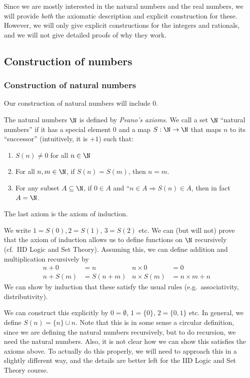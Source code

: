 \documentclass[a4paper]{article}
\begin{document}
Since we are mostly interested in the natural numbers and the real numbers, we will provide \emph{both} the axiomatic description and explicit construction for these. However, we will only give explicit constructions for the integers and rationals, and we will not give detailed proofs of why they work.

\subsection{Construction of numbers}
\subsubsection*{Construction of natural numbers}
Our construction of natural numbers will include $0$.

\begin{defi}
  The natural numbers $\N$ is defined by \emph{Peano's axioms}. We call a set $\N$ ``natural numbers'' if it has a special element $0$ and a map $S: \N \to \N$ that maps $n$ to its ``successor'' (intuitively, it is $+1$) such that:
  \begin{enumerate}
    \item $S(n) \not= 0$ for all $n \in \N$
    \item For all $n, m \in \N$, if $S(n) = S(m)$, then $n = m$.
    \item For any subset $A \subseteq \N$, if $0 \in A$ and ``$n \in A \Rightarrow S(n) \in A$, then in fact $A = \N$.
  \end{enumerate}
  The last axiom is the axiom of induction.

  We write $1 = S(0), 2 = S(1)$, $3 = S(2)$ etc. We can (but will not) prove that the axiom of induction allows us to define functions on $\N$ recursively (cf.\ IID Logic and Set Theory). Assuming this, we can define addition and multiplication recursively by
  \begin{align*}
    n + 0 &= n &n\times 0 &= 0\\
    n + S(m) &= S(n + m) & n \times S(m) &= n \times m + n
  \end{align*}
  We can show by induction that these satisfy the usual rules (e.g.\ associativity, distributivity).
\end{defi}
We can construct this explicitly by $0 = \emptyset$, $1 = \{0\}$, $2 = \{0, 1\}$ etc. In general, we define $S(n) = \{n\} \cup n$. Note that this is in some sense a circular definition, since we are defining the natural numbers recursively, but to do recursion, we need the natural numbers. Also, it is not clear how we can show this satisfies the axioms above. To actually do this properly, we will need to approach this in a slightly different way, and the details are better left for the IID Logic and Set Theory course.
\end{document}
